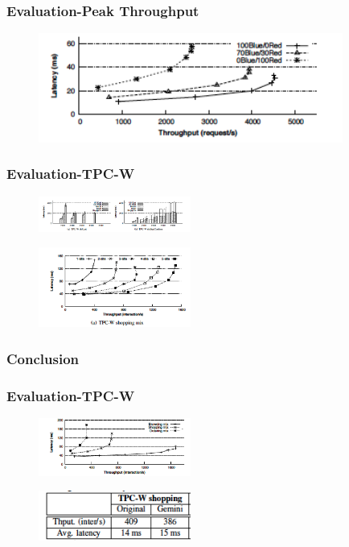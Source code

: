 \documentclass{beamer}
\begin{document}

\begin{frame}
\frametitle{Evaluation-Peak Throughput}
\begin{figure}[t]
\includegraphics[width=10cm]{pic16.jpg}
\centering
\end{figure}
\end{frame}


\begin{frame}
\frametitle{Evaluation-TPC-W}
\begin{figure}[t]
\includegraphics[width=5cm]{pic17.jpg}
\centering
\end{figure}
\begin{figure}[t]
\includegraphics[width=5cm]{pic18.jpg}
\centering
\end{figure}
\end{frame}




\begin{frame}
\frametitle{Conclusion}

\end{frame}

\begin{frame}
\frametitle{Evaluation-TPC-W}
\begin{figure}[t]
\includegraphics[width=5cm]{pic19.jpg}
\centering
\end{figure}
\begin{figure}[t]
\includegraphics[width=5cm]{pic20.jpg}
\centering
\end{figure}
\end{frame}
\end{document}
